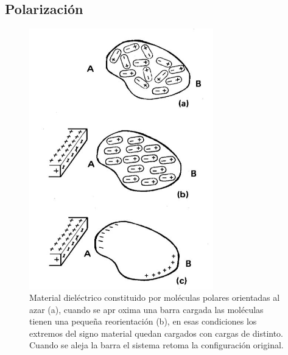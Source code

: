 \subsection{Polarización}
\begin{figure}[H]
	\centering
	\includegraphics[width=8cm]{Images/img6.JPG}
	\caption{Material dieléctrico constituido por moléculas polares orientadas al azar (a), cuando se apr oxima una barra cargada las moléculas tienen una pequeña reorientación (b), en esas condiciones los extremos del signo material quedan cargados con cargas de distinto. Cuando se aleja la barra el sistema retoma la configuración original.}
\end{figure}
